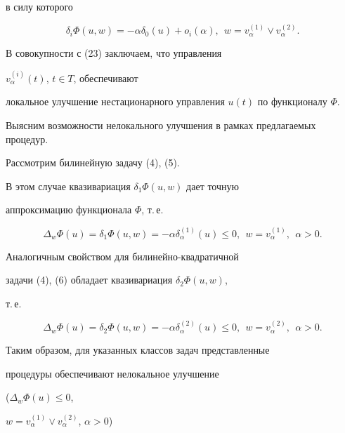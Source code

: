 в силу которого


\begin{equation}


\delta_{i}\Phi(u,w)=- \alpha\delta_{0}(u)+o_{i}(\alpha),


\ \ w=v_{\alpha}^{(1)}\vee v_{\alpha}^{(2)}.


\end{equation}


В совокупности с (23) заключаем, что управления


$v_{\alpha}^{(i)}(t)$, $t\in T $, обеспечивают


локальное улучшение нестационарного управления $u(t)$ по функционалу $\Phi$.





Выясним возможности нелокального улучшения в рамках предлагаемых процедур.





Рассмотрим билинейную задачу (4), (5).


В этом случае квазивариация $\delta_{1}\Phi(u,w)$ дает точную


аппроксимацию функционала $ \Phi$, т.\,е.


$$


\Delta_{w}\Phi(u)=\delta_{1}\Phi(u,w)=


- \alpha \delta_{\alpha}^{(1)}(u) \leq 0,


\ \ w=v_{\alpha}^{(1)},\ \ \alpha>0.


$$


Аналогичным свойством для билинейно-квадратичной 


задачи (4), (6) обладает квазивариация $\delta_{2}\Phi(u,w)$,


т.\,е.


$$


\Delta_{w}\Phi(u)=\delta_{2}\Phi(u,w)=


- \alpha \delta_{\alpha}^{(2)}(u) \leq 0,


\ \ w=v_{\alpha}^{(2)},\ \ \alpha>0.


$$





Таким образом, для указанных классов задач представленные 


процедуры обеспечивают нелокальное улучшение


($\Delta_{w}\Phi(u) \leq 0$,


$w=v_{\alpha}^{(1)}\vee v_{\alpha}^{(2)}$, $\alpha>0$)



